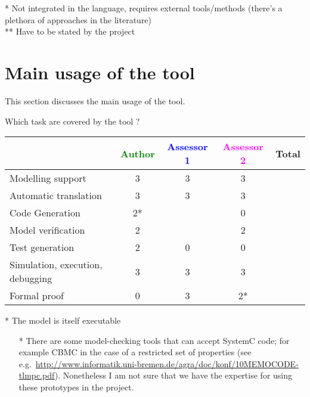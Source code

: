\begin{assesor1}
\begin{tabular}{|l | c | c | c | c|}
\end{tabular}

\begin{author_comment}
 * Not integrated in the language, requires external tools/methods (there's a plethora of approaches in the literature)\\
 ** Have to be stated by the project
\end{author_comment}

\section{Main usage of the tool}
\label{main_usage}

This section discusses the main usage of the tool.

Which task are covered by the tool ?


\begin{tabular}{|l | c | c | c | c|}
\hline
& \textcolor{green}{Author} & \textcolor{blue}{Assessor 1} & \textcolor{magenta}{Assessor 2} & Total \\
\hline
Modelling support &3 &3 &3 & \\
\hline
Automatic translation &3 &3 &3 & \\
\hline
Code Generation &2* & &0 & \\
\hline
Model verification &2 & &2 & \\
\hline
Test generation &2 &0 &0 & \\
\hline
Simulation, execution, debugging &3 &3 &3 & \\
\hline
Formal proof &0 &3 &2* & \\
\hline
\end{tabular}

\begin{author_comment}
 * The model is itself executable
\end{author_comment}



\begin{assessor2}
  \begin{itemize}
  \item[*] There are some model-checking tools that can accept SystemC
    code; for example CBMC in the case of a restricted set of
    properties (see
    e.g.~\url{http://www.informatik.uni-bremen.de/agra/doc/konf/10MEMOCODE-tlmpc.pdf}). Nonetheless
    I am not sure that we have the expertise for using these
    prototypes in the project.
  \end{itemize}  
\end{assessor2}





\end{assesor1}
